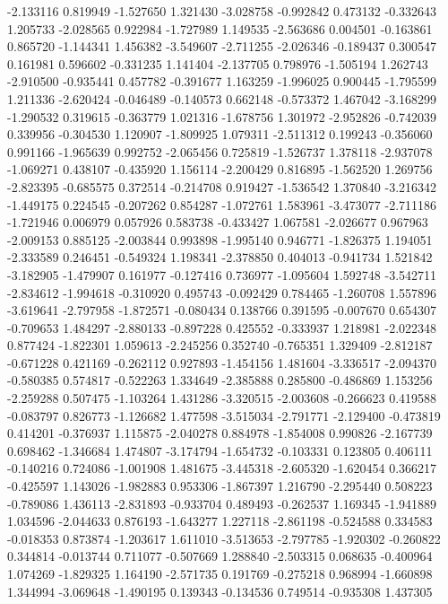 -2.133116
0.819949
-1.527650
1.321430
-3.028758
-0.992842
0.473132
-0.332643
1.205733
-2.028565
0.922984
-1.727989
1.149535
-2.563686
0.004501
-0.163861
0.865720
-1.144341
1.456382
-3.549607
-2.711255
-2.026346
-0.189437
0.300547
0.161981
0.596602
-0.331235
1.141404
-2.137705
0.798976
-1.505194
1.262743
-2.910500
-0.935441
0.457782
-0.391677
1.163259
-1.996025
0.900445
-1.795599
1.211336
-2.620424
-0.046489
-0.140573
0.662148
-0.573372
1.467042
-3.168299
-1.290532
0.319615
-0.363779
1.021316
-1.678756
1.301972
-2.952826
-0.742039
0.339956
-0.304530
1.120907
-1.809925
1.079311
-2.511312
0.199243
-0.356060
0.991166
-1.965639
0.992752
-2.065456
0.725819
-1.526737
1.378118
-2.937078
-1.069271
0.438107
-0.435920
1.156114
-2.200429
0.816895
-1.562520
1.269756
-2.823395
-0.685575
0.372514
-0.214708
0.919427
-1.536542
1.370840
-3.216342
-1.449175
0.224545
-0.207262
0.854287
-1.072761
1.583961
-3.473077
-2.711186
-1.721946
0.006979
0.057926
0.583738
-0.433427
1.067581
-2.026677
0.967963
-2.009153
0.885125
-2.003844
0.993898
-1.995140
0.946771
-1.826375
1.194051
-2.333589
0.246451
-0.549324
1.198341
-2.378850
0.404013
-0.941734
1.521842
-3.182905
-1.479907
0.161977
-0.127416
0.736977
-1.095604
1.592748
-3.542711
-2.834612
-1.994618
-0.310920
0.495743
-0.092429
0.784465
-1.260708
1.557896
-3.619641
-2.797958
-1.872571
-0.080434
0.138766
0.391595
-0.007670
0.654307
-0.709653
1.484297
-2.880133
-0.897228
0.425552
-0.333937
1.218981
-2.022348
0.877424
-1.822301
1.059613
-2.245256
0.352740
-0.765351
1.329409
-2.812187
-0.671228
0.421169
-0.262112
0.927893
-1.454156
1.481604
-3.336517
-2.094370
-0.580385
0.574817
-0.522263
1.334649
-2.385888
0.285800
-0.486869
1.153256
-2.259288
0.507475
-1.103264
1.431286
-3.320515
-2.003608
-0.266623
0.419588
-0.083797
0.826773
-1.126682
1.477598
-3.515034
-2.791771
-2.129400
-0.473819
0.414201
-0.376937
1.115875
-2.040278
0.884978
-1.854008
0.990826
-2.167739
0.698462
-1.346684
1.474807
-3.174794
-1.654732
-0.103331
0.123805
0.406111
-0.140216
0.724086
-1.001908
1.481675
-3.445318
-2.605320
-1.620454
0.366217
-0.425597
1.143026
-1.982883
0.953306
-1.867397
1.216790
-2.295440
0.508223
-0.789086
1.436113
-2.831893
-0.933704
0.489493
-0.262537
1.169345
-1.941889
1.034596
-2.044633
0.876193
-1.643277
1.227118
-2.861198
-0.524588
0.334583
-0.018353
0.873874
-1.203617
1.611010
-3.513653
-2.797785
-1.920302
-0.260822
0.344814
-0.013744
0.711077
-0.507669
1.288840
-2.503315
0.068635
-0.400964
1.074269
-1.829325
1.164190
-2.571735
0.191769
-0.275218
0.968994
-1.660898
1.344994
-3.069648
-1.490195
0.139343
-0.134536
0.749514
-0.935308
1.437305
